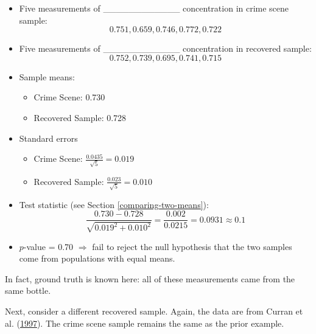\documentclass[]{book}
\providecommand{\tightlist}{%
  \setlength{\itemsep}{0pt}\setlength{\parskip}{0pt}}
\theoremstyle{definition}
\theoremstyle{definition}
\theoremstyle{remark}
\begin{document}
\begin{itemize}
\item
  Five measurements of \_\_\_\_\_\_\_\_\_\_\_\_ concentration in crime
  scene sample: \[0.751, 0.659, 0.746, 0.772, 0.722\]
\item
  Five measurements of \_\_\_\_\_\_\_\_\_\_\_\_ concentration in
  recovered sample: \[0.752, 0.739, 0.695, 0.741, 0.715\]
\item
  Sample means:

  \begin{itemize}
  \tightlist
  \item
    Crime Scene: 0.730
  \item
    Recovered Sample: 0.728
  \end{itemize}
\item
  Standard errors

  \begin{itemize}
  \tightlist
  \item
    Crime Scene: \(\frac{0.0435}{\sqrt{5}}=0.019\)
  \item
    Recovered Sample: \(\frac{0.023}{\sqrt{5}}=0.010\)
  \end{itemize}
\item
  Test statistic (see Section \ref{comparing-two-means}):
  \[\frac{0.730 - 0.728}{\sqrt{0.019^2 + 0.010^2}} = \frac{0.002}{0.0215} = 0.0931 \approx 0.1\]
\item
  \(p\)-value = 0.70 \(\Rightarrow\) fail to reject the null hypothesis
  that the two samples come from populations with equal means.
\end{itemize}

In fact, ground truth is known here: all of these measurements came from
the same bottle.

Next, consider a different recovered sample. Again, the data are from
Curran et al. (\protect\hyperlink{ref-curranetal}{1997}). The crime
scene sample remains the same as the prior example.
\end{document}

